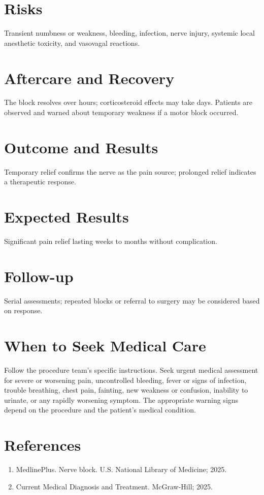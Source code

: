 \section*{Risks}
Transient numbness or weakness, bleeding, infection, nerve injury, systemic local anesthetic toxicity, and vasovagal reactions.

\section*{Aftercare and Recovery}
The block resolves over hours; corticosteroid effects may take days. Patients are observed and warned about temporary weakness if a motor block occurred.

\section*{Outcome and Results}
Temporary relief confirms the nerve as the pain source; prolonged relief indicates a therapeutic response.

\section*{Expected Results}
Significant pain relief lasting weeks to months without complication.

\section*{Follow-up}
Serial assessments; repeated blocks or referral to surgery may be considered based on response.

\section*{When to Seek Medical Care}
Follow the procedure team's specific instructions. Seek urgent medical assessment for severe or worsening pain, uncontrolled bleeding, fever or signs of infection, trouble breathing, chest pain, fainting, new weakness or confusion, inability to urinate, or any rapidly worsening symptom. The appropriate warning signs depend on the procedure and the patient's medical condition.

\section*{References}
\begin{enumerate}
  \item MedlinePlus. Nerve block. U.S. National Library of Medicine; 2025.
  \item Current Medical Diagnosis and Treatment. McGraw-Hill; 2025.
\end{enumerate}

\clearpage
